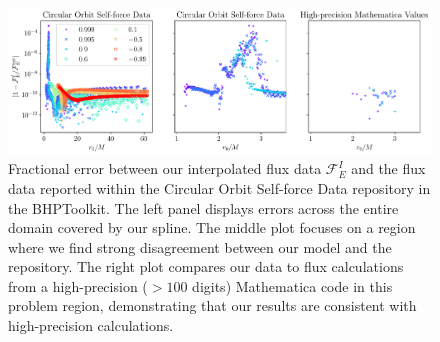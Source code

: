\documentclass[%
 reprint,
 nofootinbib,
 amsmath,amssymb,
 aps,
 prd,
]{revtex4-2}
\begin{document}
\begin{figure}[bhtp]
    \centering
    \includegraphics[width=0.95\linewidth]{figures/flux_comparison.pdf}
    \caption{Fractional error between our interpolated flux data $\mathcal{F}_E^I$ and the flux data reported within the Circular Orbit Self-force Data repository in the BHPToolkit. The left panel displays errors across the entire domain covered by our spline. The middle plot focuses on a region where we find strong disagreement between our model and the repository. The right plot compares our data to flux calculations from a high-precision ($>100$ digits) Mathematica code in this problem region, demonstrating that our results are consistent with high-precision calculations.}
    \label{fig:fluxComparison}
\end{figure}
\end{document}
